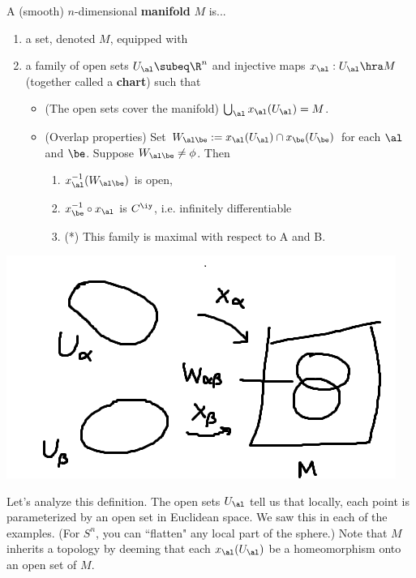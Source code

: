 \begin{df}
A (smooth) $n$-dimensional \textbf{manifold} $M$ is...
\begin{enumerate}
\item
a set, denoted $M$, equipped with
\item 
a family of open sets $U_{\al}\subeq \R^n$ and injective maps $x_{\al}:U_{\al}\hra M$ (together called a \textbf{chart}) such that
\begin{itemize}
\item
(The open sets cover the manifold) $\bigcup_{\al} x_{\al}(U_{\al})=M$. 
\item
(Overlap properties) Set $W_{\al\be}:=x_{\al}(U_{\al})\cap x_{\be}(U_{\be})$ for each $\al$ and $\be$. Suppose $W_{\al\be}\ne \phi$.
Then 
\begin{enumerate}
\item
$x_{\al}^{-1}(W_{\al\be})$ is open,
\item
$x_{\be}^{-1}\circ x_{\al}$ is $C^{\iy}$, i.e. infinitely differentiable %
\item
(*) This family is maximal with respect to A and B.
\end{enumerate}
\end{itemize}
\end{enumerate}
\end{df}

\includegraphics{1-1}

Let's analyze this definition. 
The open sets $U_{\al}$ tell us that locally, each point is  parameterized by an open set in Euclidean space. %
We saw this in each of the examples. (For $S^n$, you can ``flatten" any local part of the sphere.) 
Note that $M$ inherits a topology by deeming that each $x_{\al}(U_{\al})$ be a homeomorphism onto an open set of $M$.

